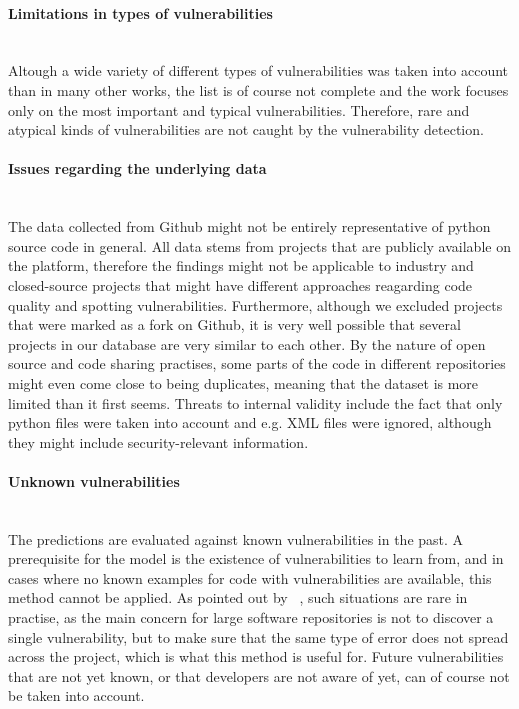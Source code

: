 \documentclass[
	a4paper,
	pagesize,
	pdftex,
	12pt,
	twoside, %
	BCOR=5mm, %
	ngerman,
	fleqn,
	final,
	]{scrartcl}
\begin{document}
\paragraph{Limitations in types of vulnerabilities}\mbox{}\\
Altough a wide variety of different types of vulnerabilities was taken into account than in many other works, the list is of course not complete and the work focuses only on the most important and typical vulnerabilities. Therefore, rare and atypical kinds of vulnerabilities are not caught by the vulnerability detection.
\paragraph{Issues regarding the underlying data}\mbox{}\\
The data collected from Github might not be entirely representative of python source code in general. All data stems from projects that are publicly available on the platform, therefore the findings might not be applicable to industry and closed-source projects that might have different approaches reagarding code quality and spotting vulnerabilities. Furthermore, although we excluded projects that were marked as a fork on Github, it is very well possible that several projects in our database are very similar to each other. By the nature of open source and code sharing practises, some parts of the code in different repositories might even come close to being duplicates, meaning that the dataset is more limited than it first seems. Threats to internal validity include the fact that only python files were taken into account and e.g. XML files were ignored, although they might include security-relevant information. 
\paragraph{Unknown vulnerabilities}\mbox{}\\
The predictions are evaluated against known vulnerabilities in the past. A prerequisite for the model is the existence of vulnerabilities to learn from, and in cases where no known examples for code with vulnerabilities are available, this method cannot be applied. As pointed out by ~\cite{Yamaguchi.2012}, such situations are rare in practise, as the main concern for large software repositories is not to discover a single vulnerability, but to make sure that the same type of error does not spread across the project, which is what this method is useful for. Future vulnerabilities that are not yet known, or that developers are not aware of yet, can of course not be taken into account.
\end{document}
